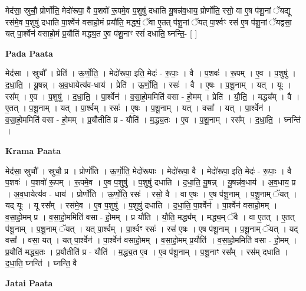 \documentclass[17pt]{extarticle}
\begin{document}
मेद॑सा॒ स्रुचौ॒ प्रोर्णो॑ति॒ मेदो॑रूपा॒ वै प॒शवो॑ रू॒पमे॒व प॒शुषु॑ दधाति यू॒षन्न॑व॒धाय॒ प्रोर्णो॑ति॒ रसो॒ वा ए॒ष प॑शू॒नां ॅयद्यू रस॑मे॒व प॒शुषु॑ दधाति पा॒र्श्वेन॑ वसाहो॒मं प्रयौ॑ति॒ मद्ध्यं॒ ॅवा ए॒तत् प॑शू॒नां ॅयत् पा॒र्श्वꣳ रस॑ ए॒ष प॑शू॒नां ॅयद्वसा॒ यत् पा॒र्श्वेन॑ वसाहो॒मं प्र॒यौति॑ मद्ध्य॒त ए॒व प॑शू॒नाꣳ रसं॑ दधाति॒ घ्नन्ति॒- [  ] \newline

\textbf{Pada Paata} \newline

मेद॑सा । स्रुचौ᳚ । प्रेति॑ । ऊ॒र्णो॒ति॒ । मेदो॑रूपा॒ इति॒ मेदः॑ - रू॒पाः॒ । वै । प॒शवः॑ । रू॒पम् । ए॒व । प॒शुषु॑ । द॒धा॒ति॒ । यू॒षन्न् । अ॒व॒धायेत्य॑व-धाय॑ । प्रेति॑ । ऊ॒र्णो॒ति॒ । रसः॑ । वै । ए॒षः । प॒शू॒नाम् । यत् । यूः । रस᳚म् । ए॒व । प॒शुषु॑ । द॒धा॒ति॒ । पा॒र्श्वेन॑ । व॒सा॒हो॒ममिति॑ वसा - हो॒मम् । प्रेति॑ । यौ॒ति॒ । मद्ध्य᳚म् । वै । ए॒तत् । प॒शू॒नाम् । यत् । पा॒र्श्वम् । रसः॑ । ए॒षः । प॒शू॒नाम् । यत् । वसा᳚ । यत् । पा॒र्श्वेन॑ । व॒सा॒हो॒ममिति॑ वसा - हो॒मम् । प्र॒यौतीति॑ प्र - यौति॑ । म॒द्ध्य॒तः । ए॒व । प॒शू॒नाम् । रस᳚म् । द॒धा॒ति॒ । घ्नन्ति॑ ।  \newline


\textbf{Krama Paata} \newline

मेद॑सा॒ स्रुचौ᳚ । स्रुचौ॒ प्र । प्रोर्णो॑ति । ऊ॒र्णो॒ति॒ मेदो॑रूपाः । मेदो॑रूपा॒ वै । मेदो॑रूपा॒ इति॒ मेदः॑ - रू॒पाः॒ । वै प॒शवः॑ । प॒शवो॑ रू॒पम् । रू॒पमे॒व । ए॒व प॒शुषु॑ । प॒शुषु॑ दधाति । द॒धा॒ति॒ यू॒षन्न् । यू॒षन्न॑व॒धाय॑ । अ॒व॒धाय॒ प्र । अ॒व॒धायेत्य॑व - धाय॑ । प्रोर्णो॑ति । ऊ॒र्णो॒ति॒ रसः॑ । रसो॒ वै । वा ए॒षः । ए॒ष प॑शू॒नाम् । प॒शू॒नाम् ॅयत् । यद् यूः । यू रस᳚म् । रस॑मे॒व । ए॒व प॒शुषु॑ । प॒शुषु॑ दधाति । द॒धा॒ति॒ पा॒र्श्वेन॑ । पा॒र्श्वेन॑ वसाहो॒मम् । व॒सा॒हो॒मम् प्र । व॒सा॒हो॒ममिति॑ वसा - हो॒मम् । प्र यौ॑ति । यौ॒ति॒ मद्ध्य᳚म् । मद्ध्य॒म् ॅवै । वा ए॒तत् । ए॒तत् प॑शू॒नाम् । प॒शू॒नाम् ॅयत् । यत् पा॒र्श्वम् । पा॒र्श्वꣳ रसः॑ । रस॑ ए॒षः । ए॒ष प॑शू॒नाम् । प॒शू॒नाम् ॅयत् । यद् वसा᳚ । वसा॒ यत् । यत् पा॒र्श्वेन॑ । पा॒र्श्वेन॑ वसाहो॒मम् । व॒सा॒हो॒मम् प्र॒यौति॑ । व॒सा॒हो॒ममिति॑ वसा - हो॒मम् । प्र॒यौति॑ मद्ध्य॒तः । प्र॒यौतीति॑ प्र - यौति॑ । म॒द्ध्य॒त ए॒व । ए॒व प॑शू॒नाम् । प॒शू॒नाꣳ रस᳚म् । रस॑म् दधाति । द॒धा॒ति॒ घ्नन्ति॑ । घ्नन्ति॒ वै \newline

\textbf{Jatai Paata} \newline
\end{document}
